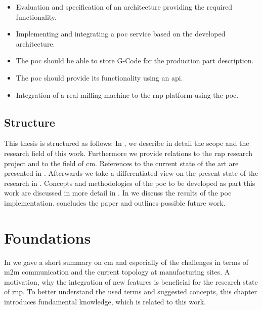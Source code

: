 \documentclass[
a4paper,
twoside,
headsepline,
cleardoublepage=empty,
parskip=half,
draft=false
]{scrbook}
\begin{document}
			\begin{itemize}
				
				\item Evaluation and specification of an architecture providing the required functionality.
				
				\item Implementing and integrating a \gls{poc} service based on the developed architecture.
				
				\item The \gls{poc} should be able to store G-Code for the production part description.
				
				\item The \gls{poc} should provide its functionality using  an \gls{api}.
				
				\item Integration of a real milling machine to the \gls{rnp} platform using the \gls{poc}.
				
			\end{itemize}
			
	\newpage
			
		\section{Structure}
		
			This thesis is structured as follows: In , we describe in detail the scope and the research field of this work. 
			Furthermore we provide relations to the \gls{rnp} research project and to the field of \gls{cm}.
			References to the current state of the art are presented in .
			Afterwards we take a differentiated view on the present state of the research in .
			Concepts and methodologies of the \gls{poc} to be developed as part this work are discussed in more detail in .
			In  we discuss the results of the \gls{poc} implementation.
			 concludes the paper and outlines possible future work.
	
	\chapter{Foundations}\label{ch:foundations}
	
		In  we gave a short summary on \gls{cm} and especially of the challenges in terms of \gls{m2m} communication and the current topology at manufacturing sites.
		A motivation, why the integration of new features is beneficial for the research state of \gls{rnp}. 
		To better understand the used terms and suggested concepts, this chapter introduces fundamental knowledge, which is related to this work.
		
\end{document}
